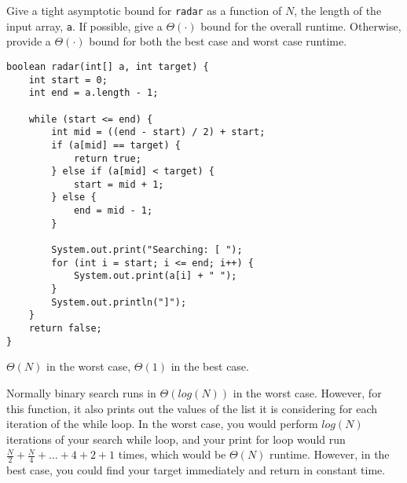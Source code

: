 \begin{blocksection}
\question Give a tight asymptotic bound for \lstinline$radar$ as a
function of $N$, the length of the input array, \lstinline$a$. If possible,
give a $\Theta(\cdot)$ bound for the overall runtime. Otherwise, provide a
$\Theta(\cdot)$ bound for both the best case and worst case runtime.

\begin{lstlisting}
boolean radar(int[] a, int target) {
    int start = 0;
    int end = a.length - 1;

    while (start <= end) {
        int mid = ((end - start) / 2) + start;
        if (a[mid] == target) {
            return true;
        } else if (a[mid] < target) {
            start = mid + 1;
        } else {
            end = mid - 1;
        }

        System.out.print("Searching: [ ");
        for (int i = start; i <= end; i++) {
            System.out.print(a[i] + " ");
        }
        System.out.println("]");
    }
    return false;
}
\end{lstlisting}

\begin{solution}[0.5in]
$\Theta(N)$ in the worst case, $\Theta(1)$ in the best case.

Normally binary search runs in $\Theta(log(N))$ in the worst case. However, for this function, it also prints out the values of the list it is considering for each iteration of the while loop. In the worst case, you would perform $log(N)$ iterations of your search while loop, and your print for loop would run $\frac{N}{2} + \frac{N}{4} + ... + 4 + 2 + 1$ times, which would be $\Theta(N)$ runtime. However, in the best case, you could find your target immediately and return in constant time.
\end{solution}
\end{blocksection}
